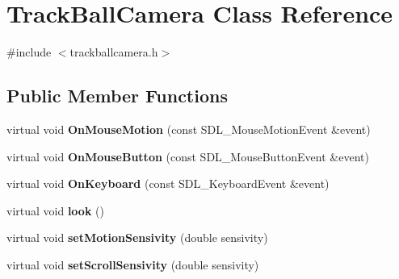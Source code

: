 \hypertarget{class_track_ball_camera}{}\section{Track\+Ball\+Camera Class Reference}
\label{class_track_ball_camera}


{\ttfamily \#include $<$trackballcamera.\+h$>$}

\subsection*{Public Member Functions}
\begin{DoxyCompactItemize}
\item 
\mbox{\label{class_track_ball_camera_a7a700f13749637899fb8749e8d136598}} 
virtual void {\bfseries On\+Mouse\+Motion} (const S\+D\+L\+\_\+\+Mouse\+Motion\+Event \&event)
\item 
\mbox{\label{class_track_ball_camera_a68e4695d4439a0f1a9dffdc474f9bcf2}} 
virtual void {\bfseries On\+Mouse\+Button} (const S\+D\+L\+\_\+\+Mouse\+Button\+Event \&event)
\item 
\mbox{\label{class_track_ball_camera_ac9d63bf5e2cc37176266d0f9002b6182}} 
virtual void {\bfseries On\+Keyboard} (const S\+D\+L\+\_\+\+Keyboard\+Event \&event)
\item 
\mbox{\label{class_track_ball_camera_ae7df52ed183dd63ec7ac6b6f4dd4f99d}} 
virtual void {\bfseries look} ()
\item 
\mbox{\label{class_track_ball_camera_a9942af262cd33039575f5c703304cc44}} 
virtual void {\bfseries set\+Motion\+Sensivity} (double sensivity)
\item 
\mbox{\label{class_track_ball_camera_a55305b75b15ea49df24b89d591798661}} 
virtual void {\bfseries set\+Scroll\+Sensivity} (double sensivity)
\end{DoxyCompactItemize}
